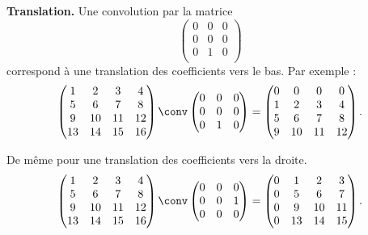 \documentclass[11pt,class=report,crop=false]{standalone}
\begin{document}

  \textbf{Translation.}
Une convolution par la matrice 
$$\begin{pmatrix}
0 & 0 & 0 \\
0 & 0 & 0 \\
0 & 1 & 0 \\
\end{pmatrix}$$ correspond à une translation des coefficients vers le bas.
Par exemple :
$$\begin{pmatrix}
1&2&3&4\\
5&6&7&8\\
9&10&11&12\\
13&14&15&16
\end{pmatrix}
\conv
\begin{pmatrix}
0 & 0 & 0 \\
0 & 0 & 0 \\
0 & 1 & 0 \\
\end{pmatrix}
= 
\begin{pmatrix}
0&0&0&0\\
1&2&3&4\\
5&6&7&8\\
9&10&11&12\\
\end{pmatrix}.$$

De même pour une translation des coefficients vers la droite.
$$\begin{pmatrix}
1&2&3&4\\
5&6&7&8\\
9&10&11&12\\
13&14&15&16\\
\end{pmatrix}
\conv
\begin{pmatrix}
0 & 0 & 0 \\
0 & 0 & 1 \\
0 & 0 & 0 \\
\end{pmatrix}
= 
\begin{pmatrix}
0&1&2&3\\
0&5&6&7\\
0&9&10&11\\
0&13&14&15\\
\end{pmatrix}.$$
\end{document}

